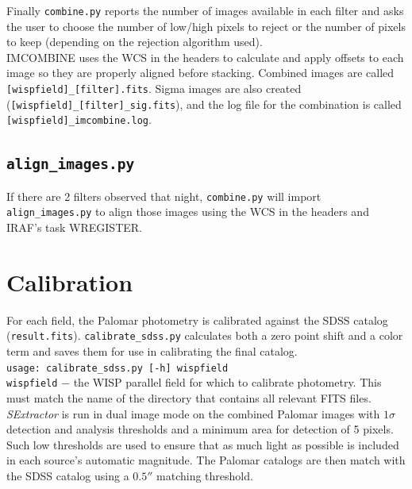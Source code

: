 \documentclass{article}
\begin{document}
\noindent Finally \texttt{combine.py} reports the number of images available
in each filter and asks the user to choose the number of low/high pixels
to reject or the number of pixels to keep 
(depending on the rejection algorithm used). \\

\noindent IMCOMBINE uses the WCS in the headers to calculate and apply 
offsets to each image so they are properly aligned before stacking. 
Combined images are called \texttt{[wispfield]\_[filter].fits}. 
Sigma images are also created (\texttt{[wispfield]\_[filter]\_sig.fits}),
and the log file for the combination is called
\texttt{[wispfield]\_imcombine.log}. \\

\subsection{\texttt{align\_images.py}}
If there are 2 filters observed that night, \texttt{combine.py} will 
import \texttt{align\_images.py} to align those images using 
the WCS in the headers and IRAF's 
task WREGISTER.

\vspace{4 mm}
\section{Calibration}
For each field, the Palomar photometry is calibrated against the SDSS catalog 
(\texttt{result.fits}). \texttt{calibrate\_sdss.py} calculates both a zero 
point shift and a color term and saves them for use in calibrating the final 
catalog. \\

\texttt{usage: calibrate\_sdss.py [-h] wispfield} \\

\texttt{wispfield} $-$ \hangindent=2.7cm the WISP parallel field for which
to calibrate photometry. This must match the name of the directory that
contains all relevant FITS files.\\


\noindent \textit{SExtractor} is run in dual image mode
on the combined Palomar images with 
$1\sigma$ detection and analysis thresholds and a minimum area for 
detection of 5 pixels. Such low thresholds are used to ensure that as much
light as possible is included in each source's automatic magnitude. The 
Palomar catalogs are then match with the SDSS catalog using a $0.5''$
matching threshold. \\
\end{document}
